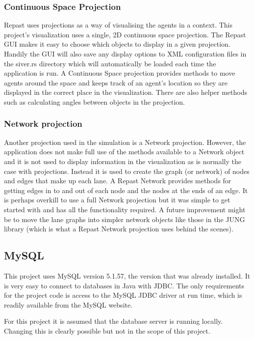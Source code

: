   \subsubsection{Continuous Space Projection}  
  Repast uses projections as a way of visualising the agents in a
  context. This project's visualization uses a single, 2D continuous
  space projection. The Repast GUI makes it easy to choose which
  objects to display in a given projection. Handily the GUI will also
  save any display options to XML configuration files in the siver.rs
  directory which will automatically be loaded each time the
  application is run. A Continuous Space
  projection provides methods to move agents around the space and keeps
  track of an agent's location so they are displayed in the correct
  place in the visualization. There are also helper methods such as
  calculating angles between objects in the projection. 


  \subsubsection{Network projection}\label{software:dependencies:repast:network}
  Another projection used in the simulation is a Network
  projection. However, the application does not make full use of the
  methods available to a Network object and it is not used to display information
  in the visualization as is normally the case with projections. Instead it is used to create the graph (or
  network) of nodes and edges that make up each lane. A Repast Network
  provides methods for getting edges in to and out of each node and
  the nodes at the ends of an edge. It is perhaps overkill to use a
  full Network projection but it was simple to get started with and
  has all the functionality required. A
  future improvement might be to move the lane graphs into simpler
  network objects like those in the JUNG library (which is what a
  Repast Network projection uses behind the scenes).


  \subsection{MySQL}
  This project uses MySQL version 5.1.57, the version that was already
  installed. It is very easy to connect to databases in
  Java with JDBC. The only requirements for the project code is access to the
  MySQL JDBC driver at run time, which is readily available from the
  MySQL website. 

  For this project it is assumed that the database server is running locally. Changing
  this is clearly possible but not in the scope of this project.

